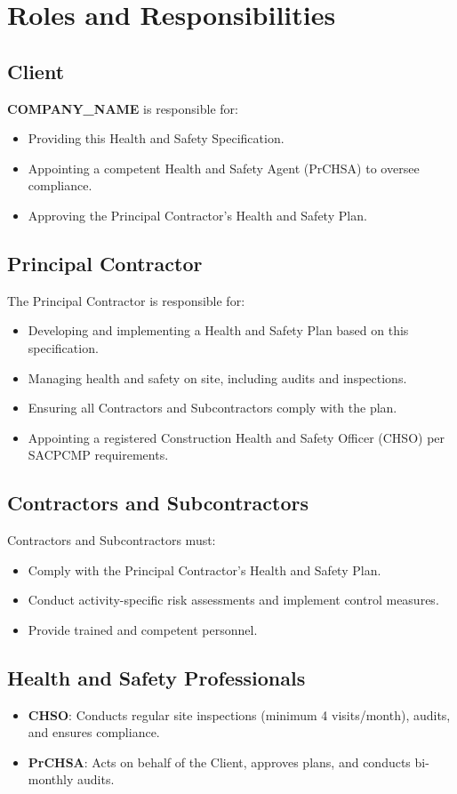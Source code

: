 \documentclass[11pt]{article}
\newcommand{\clientName}{{{COMPANY_NAME}}}
\newcommand{\clientName}{{{COMPANY_NAME}}}
\begin{document}
\section{Roles and Responsibilities}
\subsection{Client}
\textbf{\clientName} is responsible for:
\begin{itemize}
  \item Providing this Health and Safety Specification.
  \item Appointing a competent Health and Safety Agent (PrCHSA) to oversee compliance.
  \item Approving the Principal Contractor’s Health and Safety Plan.
\end{itemize}

\subsection{Principal Contractor}
The Principal Contractor is responsible for:
\begin{itemize}
  \item Developing and implementing a Health and Safety Plan based on this specification.
  \item Managing health and safety on site, including audits and inspections.
  \item Ensuring all Contractors and Subcontractors comply with the plan.
  \item Appointing a registered Construction Health and Safety Officer (CHSO) per SACPCMP requirements.
\end{itemize}

\subsection{Contractors and Subcontractors}
Contractors and Subcontractors must:
\begin{itemize}
  \item Comply with the Principal Contractor’s Health and Safety Plan.
  \item Conduct activity-specific risk assessments and implement control measures.
  \item Provide trained and competent personnel.
\end{itemize}

\subsection{Health and Safety Professionals}
\begin{itemize}
  \item \textbf{CHSO}: Conducts regular site inspections (minimum 4 visits/month), audits, and ensures compliance.
  \item \textbf{PrCHSA}: Acts on behalf of the Client, approves plans, and conducts bi-monthly audits.
\end{itemize}
\end{document}
